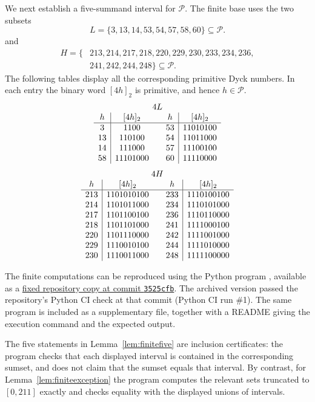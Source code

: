 \documentclass[12pt]{article}
\theoremstyle{plain}
\theoremstyle{definition}
\theoremstyle{plain}
\newcommand{\Pset}{\mathcal{P}}
\begin{document}
We next establish a five-summand interval for $\Pset$.  The finite base
uses the two subsets
\begin{equation}\label{eq:L-def}
 L=\{3,13,14,53,54,57,58,60\}\subseteq\Pset.
\end{equation}
and
\begin{equation}\label{eq:H-def}
\begin{split}
 H=\{&213,214,217,218,220,229,230,233,234,236,\\
     &241,242,244,248\}\subseteq\Pset.
\end{split}
\end{equation}
The following tables display all the corresponding primitive Dyck
numbers.  In each entry the binary word $[4h]_2$ is primitive, and hence
$h\in\Pset$.
\[
\begin{array}{c|c@{\qquad}c|c}
\multicolumn{4}{c}{4L}\\
h&[4h]_2&h&[4h]_2\\ \hline
3&1100&53&11010100\\
13&110100&54&11011000\\
14&111000&57&11100100\\
58&11101000&60&11110000
\end{array}
\]
\[
\begin{array}{c|c@{\qquad}c|c}
\multicolumn{4}{c}{4H}\\
h&[4h]_2&h&[4h]_2\\ \hline
213&1101010100&233&1110100100\\
214&1101011000&234&1110101000\\
217&1101100100&236&1110110000\\
218&1101101000&241&1111000100\\
220&1101110000&242&1111001000\\
229&1110010100&244&1111010000\\
230&1110011000&248&1111100000
\end{array}
\]

The finite computations can be reproduced using the Python program
, available as a
\href{https://github.com/growupkuriyama-hub/lean_cfg_project/blob/3525cfb/LeanCfgProject/PrimDyck/verify_certificates_for_paper.py}{fixed repository copy at commit \texttt{3525cfb}}.
The archived version passed the repository's Python CI check at that commit
(Python CI run \#1).  The same program is included as a supplementary file,
together with a README giving the execution command and the expected output.

The five statements in Lemma~\ref{lem:finitefive} are inclusion
certificates: the program checks that each displayed interval is
contained in the corresponding sumset, and does not claim that the
sumset equals that interval.  By contrast, for
Lemma~\ref{lem:finiteexception} the program computes the relevant sets
truncated to $[0,211]$ exactly and checks equality with the displayed
unions of intervals.
\end{document}
